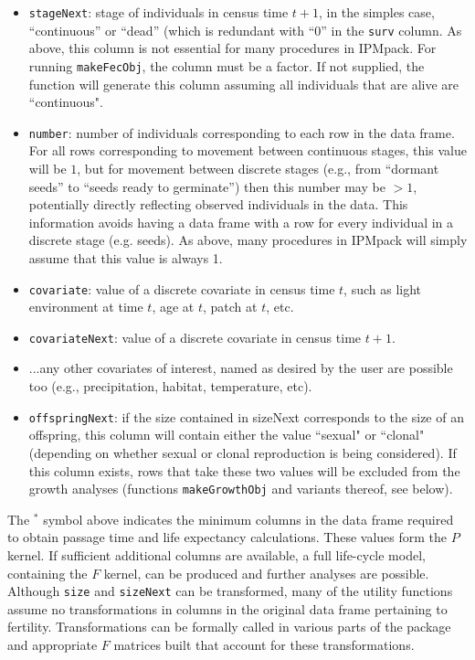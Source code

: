 \documentclass{article}
\begin{document}
\begin{itemize}
\item  {\tt stageNext}: stage of individuals in census time $t+1$, in the
simples case, ``continuous'' or ``dead'' (which is redundant with ``0''
in the {\tt surv} column. As above, this column is not essential
for many procedures in  IPMpack. For running {\tt makeFecObj}, the column must be a factor. If not supplied, the function will generate this column assuming all individuals that are alive are ``continuous".
\item  {\tt number}: number of individuals corresponding to each row in the data frame. For all rows corresponding to movement between continuous stages, this value will be $1$, but for movement between  discrete stages (e.g., from ``dormant seeds'' to ``seeds ready to  germinate'') then this number may be $>1$, potentially directly  reflecting observed individuals in the data. This information avoids having a data frame with a row for every individual in a discrete stage (e.g. seeds). As above, many  procedures in IPMpack will simply assume that this value is always 1. 
\item  {\tt covariate}: value of a discrete covariate in census time  $t$, such as light environment at time $t$, age at $t$, patch at $t$, etc. 
\item  {\tt covariateNext}: value of a discrete covariate in census time $t+1$.
\item  ...any other covariates of interest, named as desired by the user are possible too (e.g., precipitation, habitat, temperature, etc).
\item {\tt offspringNext}: if the size contained in sizeNext corresponds to the
size of an offspring, this column will contain either the value ``sexual" or
``clonal" (depending on whether sexual or clonal reproduction is being
considered). If this column exists, rows that take these two values will be excluded from the growth analyses (functions {\tt makeGrowthObj} and variants thereof, see below).
\end{itemize}

The $^*$ symbol above indicates the minimum columns in the data frame required to obtain passage time and life expectancy calculations. These values form the $P$ kernel. If sufficient additional columns are available, a full life-cycle model, containing the $F$ kernel, can be produced and further analyses are possible.  Although {\tt size} and {\tt sizeNext} can be transformed, many of the utility functions assume no transformations in columns in the original data frame pertaining to fertility. Transformations can be formally called in various parts of the package and appropriate $F$ matrices built that account for these transformations. 
\end{document}
